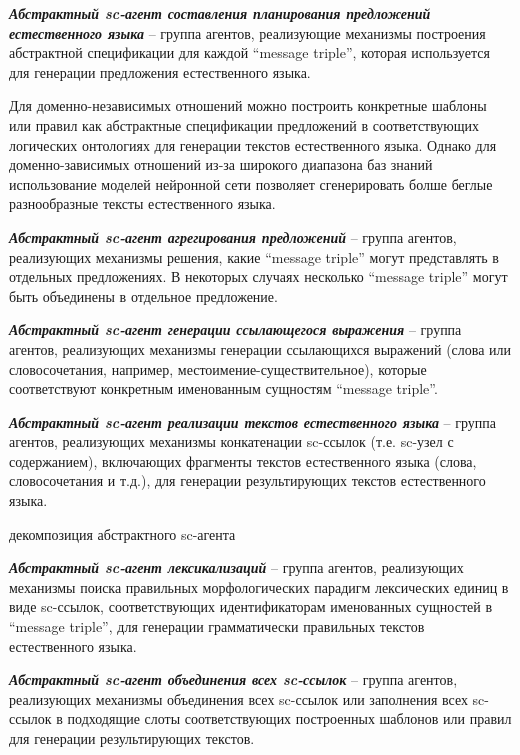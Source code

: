 \textit{\textbf{Абстрактный sc-агент составления планирования предложений естественного языка}} -- группа агентов, реализующие механизмы построения абстрактной спецификации для каждой ``message triple'', которая используется для генерации предложения естественного языка.

Для доменно-независимых отношений можно построить конкретные шаблоны или правил как абстрактные спецификации предложений в соответствующих логических онтологиях для генерации текстов естественного языка. Однако для доменно-зависимых отношений из-за широкого диапазона баз знаний использование моделей нейронной сети позволяет сгенерировать болше беглые разнообразные тексты естественного языка. 

\textit{\textbf{Абстрактный sc-агент агрегирования предложений}} -- группа агентов, реализующих механизмы решения, какие ``message triple'' могут представлять в отдельных предложениях. В некоторых случаях несколько ``message triple'' могут быть объединены в отдельное предложение.

\textit{\textbf{Абстрактный sc-агент генерации ссылающегося выражения}} -- группа агентов, реализующих механизмы генерации ссылающихся выражений (слова или словосочетания, например, местоимение-существительное), которые соответствуют конкретным именованным сущностям ``message triple''.

\textit{\textbf{Абстрактный sc-агент реализации текстов естественного языка}} -- группа агентов, реализующих механизмы конкатенации sc-ссылок (т.е. sc-узел с содержанием), включающих фрагменты текстов естественного языка (слова, словосочетания и т.д.), для генерации результирующих текстов естественного языка. 
\begin{SCn}
	\begin{scnrelfromset}{декомпозиция абстрактного sc-агента}
	\end{scnrelfromset}
\end{SCn}

\textit{\textbf{Абстрактный sc-агент лексикализаций}} -- группа агентов, реализующих механизмы поиска правильных морфологических парадигм лексических единиц в виде sc-ссылок, соответствующих идентификаторам именованных сущностей в ``message triple'', для генерации грамматически правильных текстов естественного языка.

\textit{\textbf{Абстрактный sc-агент объединения всех sc-ссылок}} -- группа агентов, реализующих механизмы объединения всех sc-ссылок или заполнения всех sc-ссылок в подходящие слоты соответствующих построенных шаблонов или правил для генерации результирующих текстов. 


